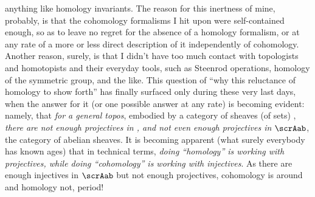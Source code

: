 anything like homology invariants. The reason for this inertness of
mine, probably, is that the cohomology formalisms I hit upon were
self-contained enough, so as to leave no regret for the absence of a
homology formalism, or at any rate of a more or less direct
description of it independently of cohomology. Another reason, surely,
is that I didn't have too much contact with topologists and
homotopists and their everyday tools, such as Steenrod operations,
homology of the symmetric group, and the like. This question of ``why
this reluctance of homology to show forth'' has finally surfaced only
during these very last days, when the answer for it (or one possible
answer at any rate) is becoming evident: namely, that \emph{for a
  general topos}, embodied by a category of sheaves (of sets) \scrA,
\emph{there are not enough projectives in \scrA, and not even enough
  projectives in $\scrAab$}, the category of abelian sheaves. It
is becoming apparent (what surely everybody has known ages) that in
technical terms, \emph{doing ``homology'' is working with projectives,
  while doing ``cohomology'' is working with injectives}. As there are
enough injectives in $\scrAab$ but not enough projectives,
cohomology is around and homology not, period!

